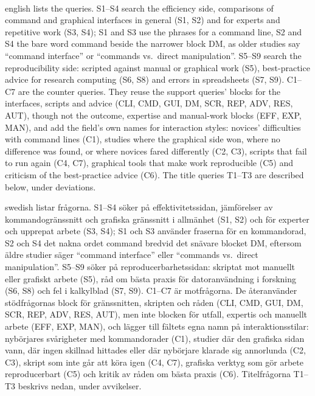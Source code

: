 \paragraph{} %
\begin{onlyin}{english} %
 lists the queries.  S1--S4 search the
efficiency side, comparisons of command and graphical interfaces in
general (S1, S2) and for experts and repetitive work (S3, S4); S1 and S3
use the phrases for a command line, S2 and S4 the bare word command
beside the narrower block DM, as older studies say \enquote{command
interface} or \enquote{commands vs.\ direct manipulation}.  S5--S9
search the reproducibility side: scripted against manual or graphical
work (S5), best-practice advice for research computing (S6, S8) and
errors in spreadsheets (S7, S9).  C1--C7 are the counter queries.  They
reuse the support queries' blocks for the interfaces, scripts and advice
(CLI, CMD, GUI, DM, SCR, REP, ADV, RES, AUT), though not the outcome,
expertise and manual-work blocks (EFF, EXP, MAN), and add the field's
own names for interaction styles: novices' difficulties with command
lines (C1), studies where the graphical side won, where no difference
was found, or where novices fared differently (C2, C3), scripts that
fail to run again (C4, C7), graphical tools that make work
reproducible (C5) and criticism of the best-practice advice (C6).  The
title queries T1--T3 are described below, under deviations.
\end{onlyin}
\begin{onlyin}{swedish}
 listar frågorna.  S1--S4 söker på
effektivitetssidan, jämförelser av kommandogränssnitt och grafiska
gränssnitt i allmänhet (S1, S2) och för experter och upprepat arbete
(S3, S4); S1 och S3 använder fraserna för en kommandorad, S2 och S4 det
nakna ordet command bredvid det snävare blocket DM, eftersom äldre
studier säger \enquote{command interface} eller \enquote{commands vs.\
direct manipulation}.  S5--S9 söker på reproducerbarhetssidan: skriptat mot
manuellt eller grafiskt arbete (S5), råd om bästa praxis för
datoranvändning i forskning (S6, S8) och fel i kalkylblad (S7, S9).
C1--C7 är motfrågorna.  De återanvänder stödfrågornas block för
gränssnitten, skripten och råden (CLI, CMD, GUI, DM, SCR, REP, ADV, RES,
AUT), men inte blocken för utfall, expertis och manuellt arbete (EFF,
EXP, MAN), och lägger till fältets egna namn på interaktionsstilar:
nybörjares svårigheter med kommandorader (C1), studier där den grafiska
sidan vann, där ingen skillnad hittades eller där nybörjare klarade sig
annorlunda (C2, C3), skript som inte går att köra igen (C4, C7),
grafiska verktyg som gör arbete reproducerbart (C5) och kritik av råden om
bästa praxis (C6).  Titelfrågorna T1--T3 beskrivs nedan, under
avvikelser.
\end{onlyin}

